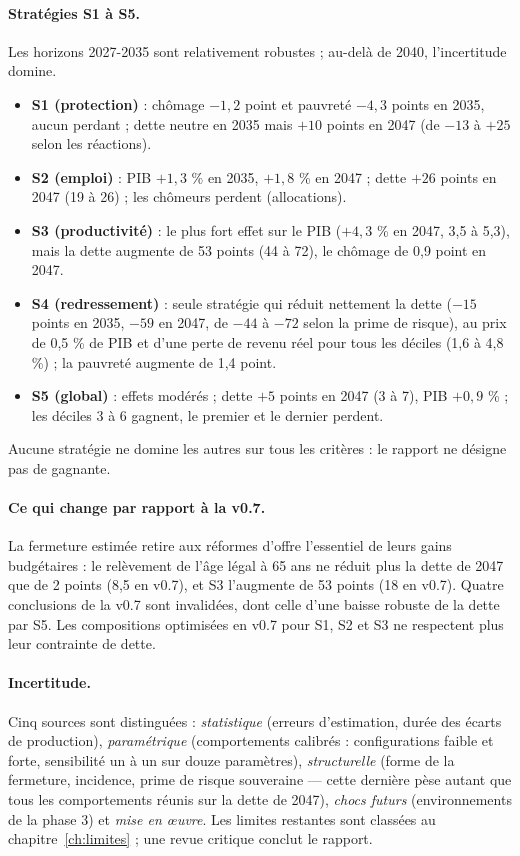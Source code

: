 \paragraph{Stratégies S1 à S5.} Les horizons 2027-2035 sont relativement robustes ; au-delà de 2040, l'incertitude domine.
\begin{itemize}
\item \textbf{S1 (protection)} : chômage $-1{,}2$ point et pauvreté $-4{,}3$ points en 2035, aucun perdant ; dette
neutre en 2035 mais $+10$ points en 2047 (de $-13$ à $+25$ selon les réactions).
\item \textbf{S2 (emploi)} : PIB $+1{,}3$ \% en 2035, $+1{,}8$ \% en 2047 ; dette $+26$ points en 2047 (19 à 26) ; les
chômeurs perdent (allocations).
\item \textbf{S3 (productivité)} : le plus fort effet sur le PIB ($+4{,}3$ \% en 2047, 3,5 à 5,3), mais la dette augmente
de 53 points (44 à 72), le chômage de 0,9 point en 2047.
\item \textbf{S4 (redressement)} : seule stratégie qui réduit nettement la dette ($-15$ points en 2035, $-59$ en 2047,
de $-44$ à $-72$ selon la prime de risque), au prix de 0,5 \% de PIB et d'une perte de revenu réel pour tous les
déciles (1,6 à 4,8 \%) ; la pauvreté augmente de 1,4 point.
\item \textbf{S5 (global)} : effets modérés ; dette $+5$ points en 2047 (3 à 7), PIB $+0{,}9$ \% ; les déciles 3 à 6
gagnent, le premier et le dernier perdent.
\end{itemize}
Aucune stratégie ne domine les autres sur tous les critères : le rapport ne désigne pas de gagnante.

\paragraph{Ce qui change par rapport à la v0.7.} La fermeture estimée retire aux réformes d'offre l'essentiel de leurs
gains budgétaires : le relèvement de l'âge légal à 65 ans ne réduit plus la dette de 2047 que de 2 points (8,5 en v0.7),
et S3 l'augmente de 53 points (18 en v0.7). Quatre conclusions de la v0.7 sont invalidées, dont celle d'une baisse
robuste de la dette par S5. Les compositions optimisées en v0.7 pour S1, S2 et S3 ne respectent plus leur contrainte de
dette.

\paragraph{Incertitude.} Cinq sources sont distinguées : \emph{statistique} (erreurs d'estimation, durée des écarts de
production), \emph{paramétrique} (comportements calibrés : configurations faible et forte, sensibilité un à un sur
douze paramètres), \emph{structurelle} (forme de la fermeture, incidence, prime de risque souveraine — cette dernière pèse
autant que tous les comportements réunis sur la dette de 2047), \emph{chocs futurs} (environnements de la phase 3) et
\emph{mise en œuvre}. Les limites restantes sont classées au chapitre~\ref{ch:limites} ; une revue critique conclut le
rapport.
